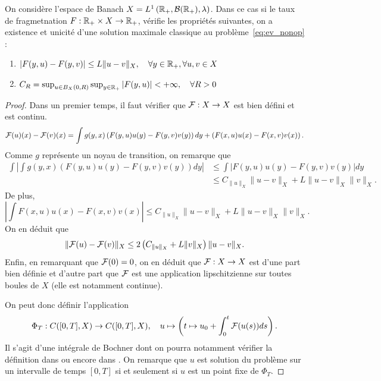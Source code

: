 \begin{prop}{}{}
	On considère l'espace de Banach $X = L^1\left(\mathbb{R}_+, \mathcal{B}(\mathbb{R}_+),\lambda\right)$. Dans ce cas si le taux de fragmetnation $F : \mathbb{R}_+ \times X \to \mathbb{R}_+$, vérifie les propriétés suivantes, on a existence et unicité d'une solution maximale classique au problème~\ref{eq:ev_nonop} :
	\begin{enumerate}
		\item $|F(y, u) - F(y,v)| \le L \|u-v\|_X, \quad \forall y \in \mathbb{R}_+, \forall u,v \in X$ \\
		\item $C_R = \sup_{u \in B_X(0,R)} \sup_{y \in \mathbb{R}_+}|F(y,u)| < +\infty, \quad \forall R >0$
	\end{enumerate}
\end{prop}

\begin{proof}
	Dans un premier temps, il faut vérifier que $\mathcal{F} : X \to X$ est bien défini et est continu.
	\[
		\mathcal{F}(u)(x) - \mathcal{F}(v)(x) = \int g(y,x) \left(F(y,u)u(y) - F(y,v)v(y)\right) dy+
		\left(F(x,u)u(x) - F(x,v)v(x) \right).
	\]
	Comme $g$ représente un noyau de transition, on remarque que
	\begin{align*}
		\int \left|\int g(y,x) \left(F(y,u)u(y) - F(y,v)v(y)\right) dy\right| & \le
		\int  \left|F(y,u)u(y) - F(y,v)v(y)\right| dy                               \\
		                                                                      & \le
		C_{\|u\|_X} \|u-v\|_X + L \|u-v\|_X \|v\|_X.
	\end{align*}
	De plus,
	\[
		\left|\int F(x,u)u(x) - F(x,v)v(x) \right| \le
		C_{\|u\|_X} \|u-v\|_X + L \|u-v\|_X \|v\|_X.
	\]
	On en déduit que
	\[
		\|\mathcal{F}(u) - \mathcal{F}(v)\|_X \le 2 \left( C_{\|u\|_X} + L \|v\|_X \right) \|u-v\|_X.
	\]
	Enfin, en remarquant que $\mathcal{F}(0) = 0$, on en déduit que $\mathcal{F} : X \to X$ est d'une part bien définie et d'autre part que $\mathcal{F}$ est une application lipschitzienne sur toutes boules de $X$ (elle est notamment continue).

	On peut donc définir l'application
	\[
		\Phi_T : C([0,T], X) \to C([0,T], X), \quad u
		\mapsto \left(t \mapsto  u_0 + \int_0^t \mathcal{F}(u(s)) ds\right).
	\]
	Il s'agit d'une intégrale de Bochner dont on pourra notamment vérifier la définition dans \cite{bochner} ou encore dans \cite{semigroup}. On remarque que $u$ est solution du problème sur un intervalle de temps $[0,T]$ si et seulement si $u$ est un point fixe de $\Phi_T$.


\end{proof}

